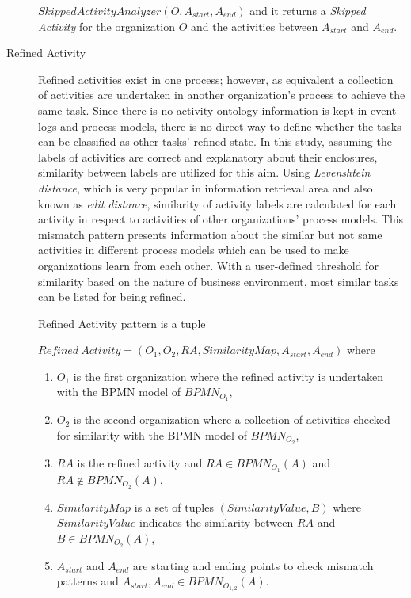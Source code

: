 \begin{description}
\begin{definition}
		$SkippedActivityAnalyzer(O, A_{start}, A_{end})$ and it returns a \textit{Skipped Activity} for the organization $O$ and the activities between $A_{start}$ and $A_{end}$.
		\end{definition}
  \item[Refined Activity] Refined activities exist in one process; however, as equivalent a collection of activities are undertaken in another organization's process to  achieve the same task. Since there is no activity ontology information is kept in event logs and process models, there is no direct way to define whether the tasks can be classified as other tasks' refined state. In this study, assuming the labels of activities are correct and explanatory about their enclosures, similarity between labels are utilized for this aim. Using \textit{Levenshtein distance}, which is very popular in information retrieval area and also known as \textit{edit distance}, similarity of activity labels are calculated for each activity in respect to activities of other organizations' process models. This mismatch pattern presents information about the similar but not same activities in different process models which can be used to make organizations learn from each other. With a user-defined threshold for similarity based on the nature of business environment, most similar tasks can be listed for being refined.
		\theoremstyle{definition}
		\begin{definition}
		Refined Activity pattern is a tuple 

		${Refined\ Activity} = (O_{1}, O_{2}, RA, SimilarityMap, A_{start}, A_{end}) $ where 
		\begin{enumerate}
		  \item $O_{1}$ is the first organization where the refined activity is undertaken with the BPMN model of $BPMN_{{O}_{1}}$,
		  \item $O_{2}$ is the second organization where a collection of activities checked for similarity with the BPMN model of $BPMN_{{O}_{2}}$,
		  \item $RA$ is the refined activity and $RA \in BPMN_{{O}_{1}}(A)$ and $RA \notin BPMN_{{O}_{2}}(A)$,
		  \item $SimilarityMap$ is a set of tuples $(SimilarityValue, B)$ where $SimilarityValue$ indicates the similarity between $RA$ and $B \in BPMN_{{O}_{2}}(A)$, 
 		  \item $A_{start}$ and $A_{end}$ are starting and ending points to check mismatch patterns and $A_{start}, A_{end} \in BPMN_{{O}_{1,2}}(A)$. 
		\end{enumerate}
		\end{definition}


\end{description}
